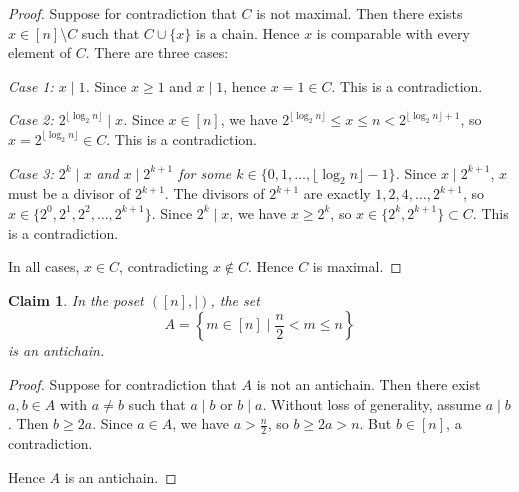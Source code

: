 \documentclass{article}
\newtheorem{claim}{Claim}
\begin{document}
\begin{proof}
    Suppose for contradiction that $C$ is not maximal. Then there exists $x \in [n] 
    \setminus C$ such that $C \cup \{x\}$ is a chain. Hence $x$ is comparable with 
    every element of $C$. There are three cases:

    \medskip
    \textit{Case 1: $x \mid 1$.}
    Since $x \geq 1$ and $x \mid 1$, hence $x = 1 \in C$. This is a contradiction.

    \medskip
    \textit{Case 2: $2^{\lfloor \log_2 n \rfloor} \mid x$.}
    Since $x \in [n]$, we have $2^{\lfloor \log_2 n \rfloor} \leq x \leq n <
    2^{\lfloor \log_2 n \rfloor + 1}$, so $x = 2^{\lfloor \log_2 n \rfloor} \in C$. 
    This is a contradiction.

    \medskip
    \textit{Case 3: $2^k \mid x$ and $x \mid 2^{k+1}$ for some $k \in \{0, 1, 
    \dots, \lfloor \log_2 n \rfloor - 1\}$.}
    Since $x \mid 2^{k+1}$, $x$ must be a divisor of $2^{k+1}$. The divisors of 
    $2^{k+1}$ are exactly $1, 2, 4, \dots, 2^{k+1}$, so $x \in \{2^0, 2^1, 2^2, 
    \dots, 2^{k+1}\}$. Since $2^k \mid x$, we have $x \geq 2^k$, so $x \in \{2^k, 
    2^{k+1}\} \subset C$. This is a contradiction.

    \medskip

    In all cases, $x \in C$, contradicting $x \notin C$. Hence $C$ is maximal.
\end{proof}

\begin{claim}
    In the poset $([n], \mid)$, the set
    \[
        A = \left\{ m \in [n] \mid \frac{n}{2} < m \leq n \right\}
    \]
    is an antichain.
\end{claim}

\begin{proof}
    Suppose for contradiction that $A$ is not an antichain. Then there exist
    $a, b \in A$ with $a \neq b$ such that $a \mid b$ or $b \mid a$. Without
    loss of generality, assume $a \mid b$. Then $b \geq 2a$. Since $a \in A$,
    we have $a > \frac{n}{2}$, so $b \geq 2a > n$. But $b \in [n]$, a
    contradiction.

    \medskip

    Hence $A$ is an antichain.
\end{proof}
\end{document}
